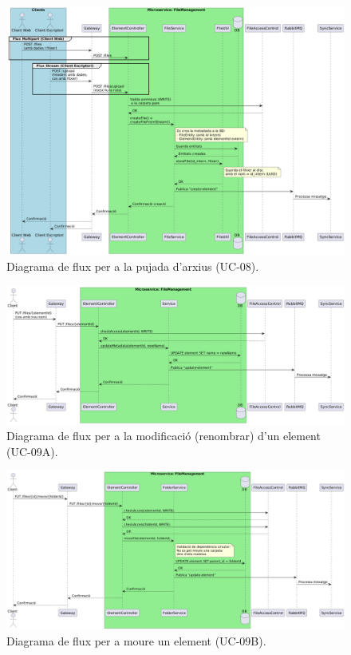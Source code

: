 \begin{figure}[H]
    \centering
    \includegraphics[width=1\textwidth]{Figures/flux/post_files.png}
    \caption{Diagrama de flux per a la pujada d'arxius (UC-08).}
    \label{fig:flow_post_files}
\end{figure}

\begin{figure}[H]
    \centering
    \includegraphics[width=1\textwidth]{Figures/flux/rename_files.png}
    \caption{Diagrama de flux per a la modificació (renombrar) d'un element (UC-09A).}
    \label{fig:flow_rename_files}
\end{figure}

\begin{figure}[H]
    \centering
    \includegraphics[width=1\textwidth]{Figures/flux/move_files.png}
    \caption{Diagrama de flux per a moure un element (UC-09B).}
    \label{fig:flow_move_files}
\end{figure}

